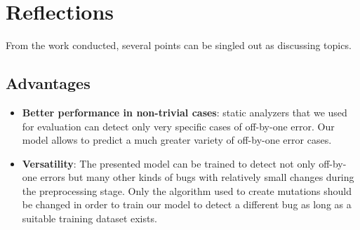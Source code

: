 \section{Reflections}\label{sec:discussion}

From the work conducted, several points can be singled out as discussing topics.

\subsection{Advantages}
\begin{itemize}
    \item {\textbf{Better performance in non-trivial cases}: static analyzers that we used for evaluation can detect only very specific cases of off-by-one error. Our model allows to predict a much greater variety of off-by-one error cases.}
    
    \item {\textbf{Versatility}: The presented model can be trained to detect not only off-by-one errors but many other kinds of bugs with relatively small changes during the preprocessing stage. Only the algorithm used to create mutations should be changed in order to train our model to detect a different bug as long as a suitable training dataset exists.}
\end{itemize}

